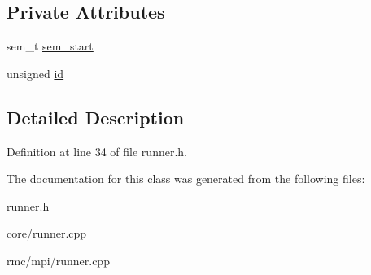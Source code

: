 \subsection*{Private Attributes}
\begin{CompactItemize}
\item 
\hypertarget{classRunner_4b0827d5df2df632db4ab71dd55e81b2}{
sem\_\-t \hyperlink{classRunner_4b0827d5df2df632db4ab71dd55e81b2}{sem\_\-start}}
\label{classRunner_4b0827d5df2df632db4ab71dd55e81b2}

\item 
\hypertarget{classRunner_1989c1f8e0b0b54ad2e60a341007e59d}{
unsigned \hyperlink{classRunner_1989c1f8e0b0b54ad2e60a341007e59d}{id}}
\label{classRunner_1989c1f8e0b0b54ad2e60a341007e59d}

\end{CompactItemize}


\subsection{Detailed Description}




Definition at line 34 of file runner.h.

The documentation for this class was generated from the following files:\begin{CompactItemize}
\item 
runner.h\item 
core/runner.cpp\item 
rmc/mpi/runner.cpp\end{CompactItemize}
